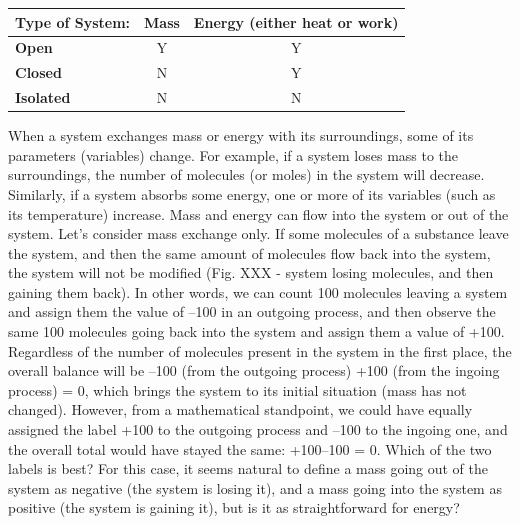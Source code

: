 \documentclass[
]{book}
\theoremstyle{definition}
\theoremstyle{definition}
\theoremstyle{definition}
\theoremstyle{remark}
\begin{document}
\begin{longtable}[]{@{}lcc@{}}
\toprule
Type of System: & Mass & Energy (either heat or work)\tabularnewline
\midrule
\endhead
\textbf{Open} & Y & Y\tabularnewline
\textbf{Closed} & N & Y\tabularnewline
\textbf{Isolated} & N & N\tabularnewline
\bottomrule
\end{longtable}

When a system exchanges mass or energy with its surroundings, some of its parameters (variables) change. For example, if a system loses mass to the surroundings, the number of molecules (or moles) in the system will decrease. Similarly, if a system absorbs some energy, one or more of its variables (such as its temperature) increase. Mass and energy can flow into the system or out of the system. Let's consider mass exchange only. If some molecules of a substance leave the system, and then the same amount of molecules flow back into the system, the system will not be modified (Fig. XXX - system losing molecules, and then gaining them back). In other words, we can count 100 molecules leaving a system and assign them the value of --100 in an outgoing process, and then observe the same 100 molecules going back into the system and assign them a value of +100. Regardless of the number of molecules present in the system in the first place, the overall balance will be --100 (from the outgoing process) +100 (from the ingoing process) = 0, which brings the system to its initial situation (mass has not changed). However, from a mathematical standpoint, we could have equally assigned the label +100 to the outgoing process and --100 to the ingoing one, and the overall total would have stayed the same: +100--100 = 0. Which of the two labels is best? For this case, it seems natural to define a mass going out of the system as negative (the system is losing it), and a mass going into the system as positive (the system is gaining it), but is it as straightforward for energy?
\end{document}
